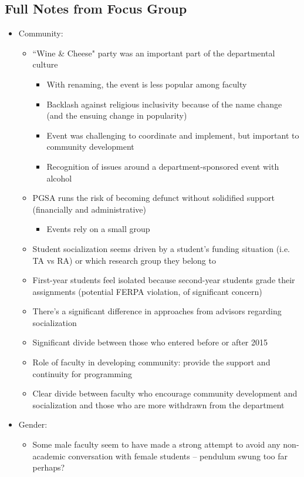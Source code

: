 \documentclass[oneside]{book}   %
\begin{document}
\subsection{Full Notes from Focus Group}
\begin{itemize}
	\item Community:
		\begin{itemize}
			\item ``Wine \& Cheese" party was an important part of the departmental culture
				\begin{itemize}
					\item With renaming, the event is less popular among faculty
					\item Backlash against religious inclusivity because of the name change (and the ensuing change in popularity)
					\item Event was challenging to coordinate and implement, but important to community development
					\item Recognition of issues around a department-sponsored event with alcohol
				\end{itemize}
			\item PGSA runs the risk of becoming defunct without solidified support (financially and administrative) 
			\begin{itemize}
				\item Events rely on a small group 		
			\end{itemize}
			\item Student socialization seems driven by a student’s funding situation (i.e. TA vs RA) or which research group they belong to
			\item First-year students feel isolated because second-year students grade their assignments (potential FERPA violation, of significant concern)
			\item There’s a significant difference in approaches from advisors regarding socialization 
			\item Significant divide between those who entered before or after 2015
			\item Role of faculty in developing community: provide the support and continuity for programming
			\item Clear divide between faculty who encourage community development and socialization and those who are more withdrawn from the department
		\end{itemize}
	\item Gender:
		\begin{itemize}
			\item Some male faculty seem to have made a strong attempt to avoid any non-academic conversation with female students – pendulum swung too far perhaps?

\end{itemize}
\end{itemize}
\end{document}
